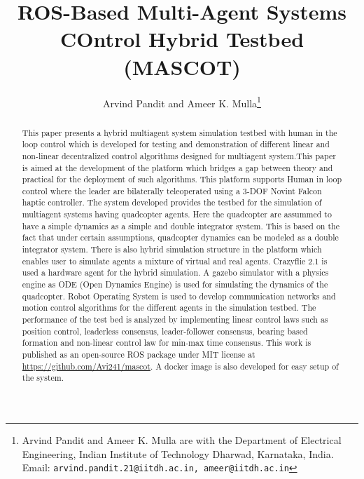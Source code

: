 \documentclass[letterpaper, 10 pt, conference]{ieeeconf}
\begin{document}
\title{ROS-Based \textbf{M}ulti-\textbf{A}gent \textbf{S}ystems \textbf{CO}ntrol Hybrid \textbf{T}estbed (MASCOT)}
\author{Arvind Pandit and Ameer K. Mulla\thanks{Arvind Pandit and Ameer K. Mulla are with the Department of Electrical Engineering, Indian Institute of Technology Dharwad, Karnataka, India. Email: \texttt{arvind.pandit.21@iitdh.ac.in, ameer@iitdh.ac.in}}}



\maketitle
\begin{abstract}
    This paper presents a hybrid multiagent system simulation testbed with human in the loop control which is developed for testing and demonstration of different linear and non-linear decentralized control algorithms designed for multiagent system.This paper is aimed at the development of the platform which bridges a gap between theory and practical for the deployment of such algorithms. This platform supports Human in loop control where the leader are bilaterally teleoperated using a 3-DOF Novint Falcon haptic controller. The system developed provides the testbed for the simulation of multiagent systems having quadcopter agents. Here the quadcopter are assummed to have a simple dynamics as a simple and double integrator system. This is based on the fact that under certain assumptions, quadcopter dynamics can be  modeled as a double integrator system. There is also hybrid simulation structure in the platform which enables user to simulate agents a mixture of virtual and real agents. Crazyflie 2.1 is used a hardware agent for the hybrid simulation. A gazebo simulator with a physics engine as ODE (Open Dynamics Engine) is used for simulating the dynamics of the quadcopter. Robot Operating System is used to develop communication networks and motion control algorithms for the different agents in the simulation testbed. The performance of the test bed is analyzed by implementing linear control laws such as position control, leaderless consensus, leader-follower consensus, bearing based formation and non-linear control law for min-max time consensus. This work is published as an open-source ROS package under MIT license at \url{https://github.com/Avi241/mascot}. A docker image is also developed for easy setup of the system.
\end{abstract}
\end{document}
